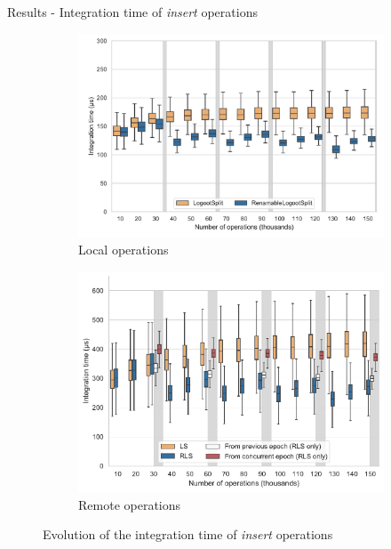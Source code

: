 \documentclass[10pt]{beamer}
\begin{document}
\begin{frame}{Results - Integration time of \emph{insert} operations}
  \begin{figure}
    \captionsetup[subfigure]{aboveskip=-1pt,belowskip=-1pt}
    \centering
    \begin{subfigure}{0.47\columnwidth}
        \includegraphics[width=1\textwidth]{img/integration-time-boxplot-local-operations-without-outliers.pdf}
        \caption{Local operations}
        \label{fig:evolution-integration-time-local-insert-remove}
    \end{subfigure}
    \begin{subfigure}{0.47\columnwidth}
        \includegraphics[width=1\textwidth]{img/integration-time-boxplot-remote-operations-without-outliers.pdf}
        \caption{Remote operations}
        \label{fig:evolution-integration-time-remote-insert-remove}
    \end{subfigure}
    \caption{Evolution of the integration time of \emph{insert} operations}
    \label{fig:evolution-integration-time-insert-remove}
  \end{figure}


\end{frame}
\end{document}
